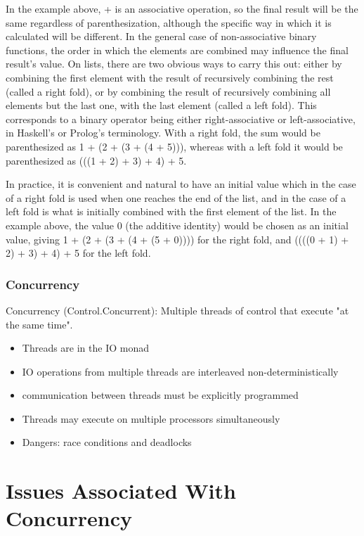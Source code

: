 \documentclass[a4paper,oneside]{report}
\begin{document}
			In the example above, + is an associative operation, so the final result will be the same regardless of parenthesization, although the specific way in which it is calculated will be different. In the general case of non-associative binary functions, the order in which the elements are combined may influence the final result's value. On lists, there are two obvious ways to carry this out: either by combining the first element with the result of recursively combining the rest (called a right fold), or by combining the result of recursively combining all elements but the last one, with the last element (called a left fold). This corresponds to a binary operator being either right-associative or left-associative, in Haskell's or Prolog's terminology. With a right fold, the sum would be parenthesized as 1 + (2 + (3 + (4 + 5))), whereas with a left fold it would be parenthesized as (((1 + 2) + 3) + 4) + 5.

			 In practice, it is convenient and natural to have an initial value which in the case of a right fold is used when one reaches the end of the list, and in the case of a left fold is what is initially combined with the first element of the list. In the example above, the value 0 (the additive identity) would be chosen as an initial value, giving 1 + (2 + (3 + (4 + (5 + 0)))) for the right fold, and ((((0 + 1) + 2) + 3) + 4) + 5 for the left fold.
			


      		\subsubsection{Concurrency}
			Concurrency (Control.Concurrent): Multiple threads of control that execute "at the same time".

				\begin{itemize}
					\item Threads are in the IO monad
					\item IO operations from multiple threads are interleaved non-deterministically
					\item communication between threads must be explicitly programmed
					\item Threads may execute on multiple processors simultaneously
					\item Dangers: race conditions and deadlocks
				\end{itemize}

    	
  	\section{Issues Associated With Concurrency}
  	
\end{document}
